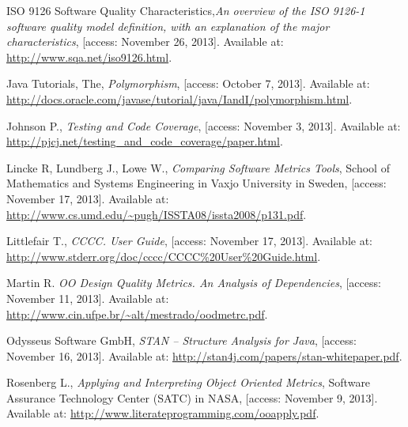 \begin{thebibliography}{100}
	 ISO 9126 Software Quality Characteristics,{\em An overview of the ISO 9126-1 software quality model definition, with an explanation of the major characteristics}, [access: November 26, 2013]. Available at: \url{http://www.sqa.net/iso9126.html}.

	 Java Tutorials, The, {\em Polymorphism}, [access: October 7, 2013]. Available at: \\ \url{http://docs.oracle.com/javase/tutorial/java/IandI/polymorphism.html}.	
	
	 Johnson P., {\em Testing and Code Coverage}, [access: November 3, 2013]. Available at: \url{http://pjcj.net/testing_and_code_coverage/paper.html}.

	 Lincke R, Lundberg J., Lowe W., {\em Comparing Software Metrics Tools}, School of Mathematics and Systems Engineering in Vaxjo University in Sweden, [access: November 17, 2013]. Available at: \url{http://www.cs.umd.edu/~pugh/ISSTA08/issta2008/p131.pdf}.
 
	 Littlefair T., {\em CCCC. User Guide}, [access: November 17, 2013]. Available at: \url{http://www.stderr.org/doc/cccc/CCCC\%20User\%20Guide.html}. 

	 Martin R. {\em OO Design Quality Metrics. An Analysis of Dependencies}, [access: November 11, 2013]. Available at: \url{http://www.cin.ufpe.br/~alt/mestrado/oodmetrc.pdf}.
	
	 Odysseus Software GmbH, {\em STAN – Structure Analysis for Java}, [access: November 16, 2013]. Available at: \url{http://stan4j.com/papers/stan-whitepaper.pdf}. 
	
	 Rosenberg L., {\em Applying and Interpreting Object Oriented Metrics}, Software Assurance Technology Center (SATC) in NASA, [access: November 9, 2013]. Available at: \url{http://www.literateprogramming.com/ooapply.pdf}.
 
\end{thebibliography}